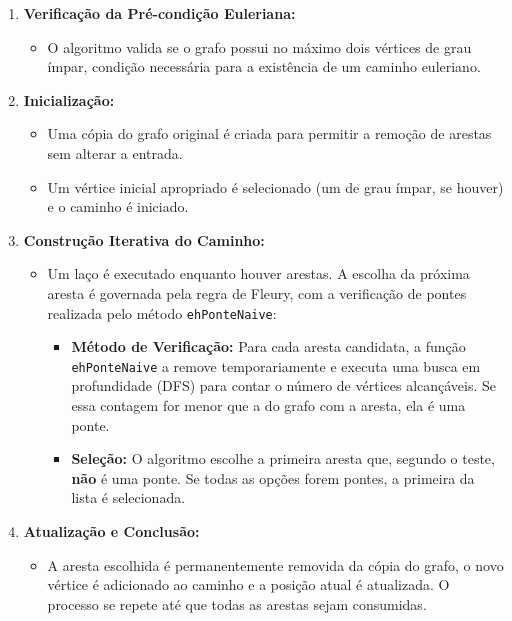 \documentclass[12pt]{article}
\begin{document}
\begin{enumerate}
    \item \textbf{Verifica\c{c}\~ao da Pr\'e-condi\c{c}\~ao Euleriana:}
    \begin{itemize}
        \item O algoritmo valida se o grafo possui no m\'aximo dois v\'ertices de grau \'impar, condi\c{c}\~ao necess\'aria para a exist\^encia de um caminho euleriano.
    \end{itemize}

    \item \textbf{Inicializa\c{c}\~ao:}
    \begin{itemize}
        \item Uma c\'opia do grafo original \'e criada para permitir a remo\c{c}\~ao de arestas sem alterar a entrada.
        \item Um v\'ertice inicial apropriado \'e selecionado (um de grau \'impar, se houver) e o caminho \'e iniciado.
    \end{itemize}

    \item \textbf{Constru\c{c}\~ao Iterativa do Caminho:}
    \begin{itemize}
        \item Um la\c{c}o \'e executado enquanto houver arestas. A escolha da pr\'oxima aresta \'e governada pela regra de Fleury, com a verifica\c{c}\~ao de pontes realizada pelo m\'etodo \texttt{ehPonteNaive}:
        \begin{itemize}
            \item \textbf{M\'etodo de Verifica\c{c}\~ao:} Para cada aresta candidata, a fun\c{c}\~ao \texttt{ehPonteNaive} a remove temporariamente e executa uma busca em profundidade (DFS) para contar o n\'umero de v\'ertices alcan\c{c}\'aveis. Se essa contagem for menor que a do grafo com a aresta, ela \'e uma ponte.
            \item \textbf{Sele\c{c}\~ao:} O algoritmo escolhe a primeira aresta que, segundo o teste, \textbf{n\~ao} \'e uma ponte. Se todas as op\c{c}\~oes forem pontes, a primeira da lista \'e selecionada.
        \end{itemize}
    \end{itemize}
    
    \item \textbf{Atualiza\c{c}\~ao e Conclus\~ao:}
    \begin{itemize}
        \item A aresta escolhida \'e permanentemente removida da c\'opia do grafo, o novo v\'ertice \'e adicionado ao caminho e a posi\c{c}\~ao atual \'e atualizada. O processo se repete at\'e que todas as arestas sejam consumidas.
    \end{itemize}
\end{enumerate}
\end{document}
